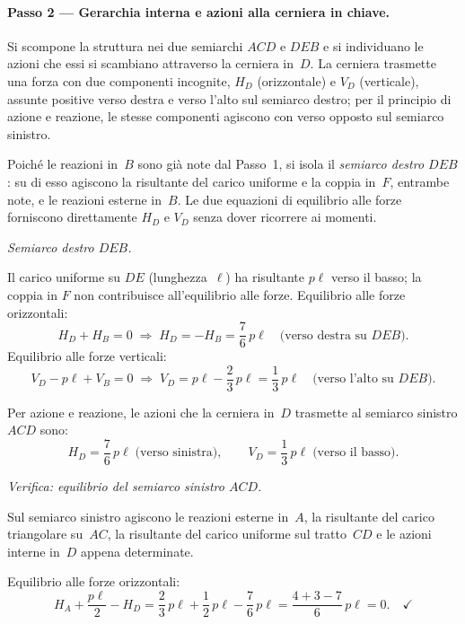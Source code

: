 \paragraph{Passo 2 --- Gerarchia interna e azioni
	alla cerniera in chiave.}

Si scompone la struttura nei due semiarchi
$ACD$ e $DEB$ e si individuano le azioni che essi si
scambiano attraverso la cerniera in~$D$.
La cerniera trasmette una forza con due componenti
incognite, $H_D$ (orizzontale) e $V_D$ (verticale),
assunte positive verso destra e verso l'alto sul
semiarco destro; per il principio di azione e
reazione, le stesse componenti agiscono con verso
opposto sul semiarco sinistro.

Poiché le reazioni in~$B$ sono già note dal Passo~1,
si isola il \emph{semiarco destro $DEB$}: su di esso
agiscono la risultante del carico uniforme e la coppia
in~$F$, entrambe note, e le reazioni esterne in~$B$.
Le due equazioni di equilibrio alle forze forniscono
direttamente $H_D$ e $V_D$ senza dover ricorrere ai
momenti.

\medskip
\noindent\textit{Semiarco destro $DEB$.}

Il carico uniforme su $DE$ (lunghezza~$\ell$)
ha risultante $p\ell$ verso il basso;
la coppia in $F$ non contribuisce all'equilibrio
alle forze.
Equilibrio alle forze orizzontali:
\[
H_D + H_B = 0
\;\Rightarrow\;
H_D = -H_B = \frac{7}{6}\,p\ell
\quad\text{(verso destra su } DEB\text{)}.
\]
Equilibrio alle forze verticali:
\[
V_D - p\ell + V_B = 0
\;\Rightarrow\;
V_D = p\ell - \frac{2}{3}\,p\ell = \frac{1}{3}\,p\ell
\quad\text{(verso l'alto su } DEB\text{)}.
\]

Per azione e reazione, le azioni che la cerniera
in~$D$ trasmette al semiarco sinistro $ACD$ sono:
\[
H_D = \frac{7}{6}\,p\ell
\;\text{(verso sinistra)},
\qquad
V_D = \frac{1}{3}\,p\ell
\;\text{(verso il basso)}.
\]

\medskip
\noindent\textit{Verifica: equilibrio del semiarco
	sinistro $ACD$.}

Sul semiarco sinistro agiscono le reazioni esterne
in~$A$, la risultante del carico triangolare su~$AC$,
la risultante del carico uniforme sul tratto~$CD$
e le azioni interne in~$D$ appena determinate.

\noindent Equilibrio alle forze orizzontali:
\[
H_A + \frac{p\ell}{2} - H_D
= \frac{2}{3}\,p\ell + \frac{1}{2}\,p\ell - \frac{7}{6}\,p\ell
= \frac{4+3-7}{6}\,p\ell = 0.
\quad\checkmark
\]

